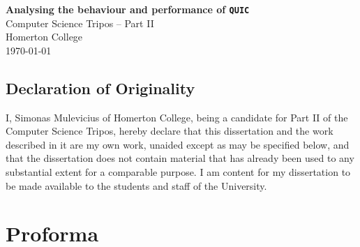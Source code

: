 \documentclass[12pt,a4paper]{report}
\begin{document}




\pagestyle{empty}


\vspace*{60mm}
\begin{center}
\Huge
\textbf{Analysing the behaviour and performance of \texttt{QUIC}} \\[5mm]
Computer Science Tripos -- Part II \\[5mm]
Homerton College \\[5mm]
\today  %
\end{center}








\newpage



\section*{Declaration of Originality}

I, Simonas Mulevicius of Homerton College, being a candidate for Part II of the Computer
Science Tripos, hereby declare
that this dissertation and the work described in it are my own work,
unaided except as may be specified below, and that the dissertation
does not contain material that has already been used to any substantial
extent for a comparable purpose. I am content for my dissertation to
be made available to the students and staff of the University.

\bigskip
{}

\medskip
{}


\newpage











\pagestyle{plain}

\chapter*{Proforma}
\end{document}
